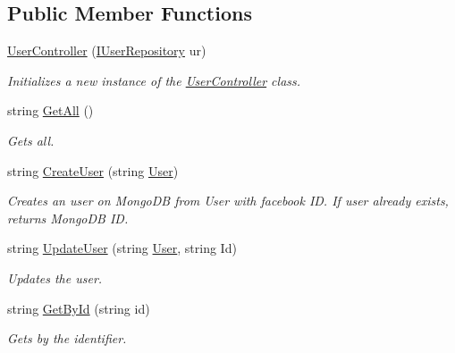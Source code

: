 \subsection*{Public Member Functions}
\begin{DoxyCompactItemize}
\item 
\hyperlink{class_wis_r_rest_a_p_i_1_1_controllers_1_1_user_controller_af8152952e406cfcec821fe4ae0a1e195}{User\+Controller} (\hyperlink{interface_wis_r_rest_a_p_i_1_1_domain_model_1_1_i_user_repository}{I\+User\+Repository} ur)
\begin{DoxyCompactList}\small\item\em Initializes a new instance of the \hyperlink{class_wis_r_rest_a_p_i_1_1_controllers_1_1_user_controller}{User\+Controller} class. \end{DoxyCompactList}\item 
string \hyperlink{class_wis_r_rest_a_p_i_1_1_controllers_1_1_user_controller_a4c83db8f3ccdae60f0f865f8fc968206}{Get\+All} ()
\begin{DoxyCompactList}\small\item\em Gets all. \end{DoxyCompactList}\item 
string \hyperlink{class_wis_r_rest_a_p_i_1_1_controllers_1_1_user_controller_aaf05bf7eaaf61d32561f66ddb4b8f8a9}{Create\+User} (string \hyperlink{class_wis_r_1_1_domain_models_1_1_user}{User})
\begin{DoxyCompactList}\small\item\em Creates an user on Mongo\+D\+B from User with facebook I\+D. If user already exists, returns Mongo\+D\+B I\+D. \end{DoxyCompactList}\item 
string \hyperlink{class_wis_r_rest_a_p_i_1_1_controllers_1_1_user_controller_a460cd7b02a8b42d0b1a3c90476ae3b3e}{Update\+User} (string \hyperlink{class_wis_r_1_1_domain_models_1_1_user}{User}, string Id)
\begin{DoxyCompactList}\small\item\em Updates the user. \end{DoxyCompactList}\item 
string \hyperlink{class_wis_r_rest_a_p_i_1_1_controllers_1_1_user_controller_a61784914b643252724c463565b0432f9}{Get\+By\+Id} (string id)
\begin{DoxyCompactList}\small\item\em Gets by the identifier. \end{DoxyCompactList}\item 

\end{DoxyCompactItemize}
